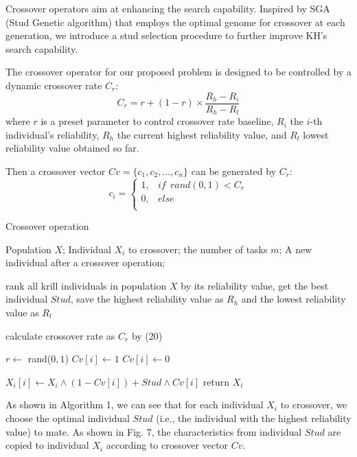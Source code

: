 \documentclass[journal]{IEEEtran}
\begin{document}
Crossover operators aim at enhancing the search capability. Inspired by SGA (Stud Genetic algorithm) \cite{wang2014stud} that employs the optimal genome for crossover at each generation, we introduce a stud selection procedure to further improve KH's search capability.

The crossover operator for our proposed problem is designed to be controlled by a dynamic crossover rate $C_{r}$:
\begin{equation}
C_{r} = r + (1-r) \times \frac{R_{h}-R_{i}}{R_{h}-R_{l}}
\end{equation}
where $r$ is a preset parameter to control crossover rate baseline, $R_{i}$ the $i$-th individual's reliability, $R_{h}$ the current highest reliability value, and $R_{l}$ lowest reliability value obtained so far.

Then a crossover vector $Cv = \{c_{1},c_{2},...,c_{n}\}$ can be generated by $C_{r}$:
\begin{equation}
c_{i}=
\begin{cases}
1,& if \ \ rand(0,1) < C_{r}\\
0,& else\\
\end{cases}
\end{equation}

\begin{algorithm}
\caption{Crossover operation}
\label{Crossover operation}
\begin{algorithmic}[1]

\REQUIRE Population $X$; Individual $X_i$ to crossover; the number of tasks $m$; 
\ENSURE A new individual after a crossover operation;

\STATE rank all krill individuals in population $X$ by its reliability value, get the best individual $Stud$, save the highest reliability value as $R_{h}$ and the lowest reliability value as $R_{l}$

\STATE calculate crossover rate as $C_{r}$ by (20)

\STATE $r \leftarrow$ rand($0,1$)
\STATE $Cv[i] \leftarrow 1$
\ELSE
\STATE $Cv[i] \leftarrow 0$
\ENDIF
\ENDFOR

\STATE $X_i[i] \leftarrow X_i \wedge  (1-Cv[i]) + Stud \wedge Cv[i]$ 
\ENDFOR
\STATE return $X_i$
\end{algorithmic}
\end{algorithm}

As shown in Algorithm 1, we can see that for each individual $X_i$ to crossover, we choose the optimal individual $Stud$ (i.e., the individual with the highest reliability value) to mate. As shown in Fig. 7, the characteristics from individual $Stud$ are copied to individual $X_i$ according to crossover vector $Cv$. 
\end{document}
